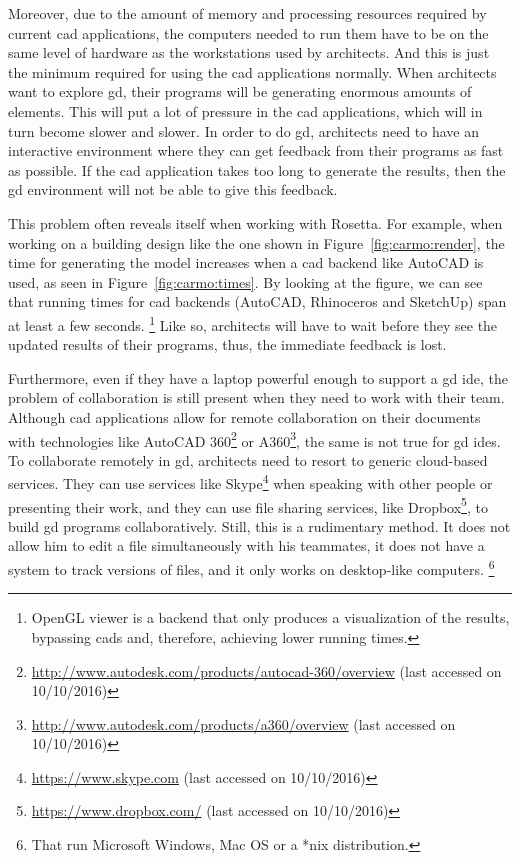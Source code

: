 Moreover, due to the amount of memory and processing resources required by current \gls{cad} applications, the computers needed to run them have to be on the same level of hardware as the workstations used by architects.
And this is just the minimum required for using the \gls{cad} applications normally.
When architects want to explore \gls{gd}, their programs will be generating enormous amounts of elements.
This will put a lot of pressure in the \gls{cad} applications, which will in turn become slower and slower.
In order to do \gls{gd}, architects need to have an interactive environment where they can get feedback from their programs as fast as possible.
If the \gls{cad} application takes too long to generate the results, then the \gls{gd} environment will not be able to give this feedback.

This problem often reveals itself when working with Rosetta.
For example, when working on a building design like the one shown in Figure~\ref{fig:carmo:render}, the time for generating the model increases when a \gls{cad} backend like AutoCAD is used, as seen in Figure~\ref{fig:carmo:times}.
By looking at the figure, we can see that running times for \gls{cad} backends (AutoCAD, Rhinoceros and SketchUp) span at least a few seconds.%
\footnote{OpenGL viewer is a backend that only produces a visualization of the results, bypassing \glspl{cad} and, therefore, achieving lower running times.}
Like so, architects will have to wait before they see the updated results of their programs, thus, the immediate feedback is lost.

Furthermore, even if they have a laptop powerful enough to support a \gls{gd} \gls{ide}, the problem of collaboration is still present when they need to work with their team.
Although \gls{cad} applications allow for remote collaboration on their documents with technologies like AutoCAD 360\footnote{\url{http://www.autodesk.com/products/autocad-360/overview} (last accessed on 10/10/2016)} or A360\footnote{\url{http://www.autodesk.com/products/a360/overview} (last accessed on 10/10/2016)}, the same is not true for \gls{gd} \glspl{ide}.
To collaborate remotely in \gls{gd}, architects need to resort to generic cloud-based services.
They can use services like Skype\footnote{\url{https://www.skype.com} (last accessed on 10/10/2016)} when speaking with other people or presenting their work, and they can use file sharing services, like Dropbox\footnote{\url{https://www.dropbox.com/} (last accessed on 10/10/2016)}, to build \gls{gd} programs collaboratively.
Still, this is a rudimentary method.
It does not allow him to edit a file simultaneously with his teammates, it does not have a system to track versions of files, and it only works on desktop-like computers.%
\footnote{That run Microsoft Windows, Mac OS or a *nix distribution.}

